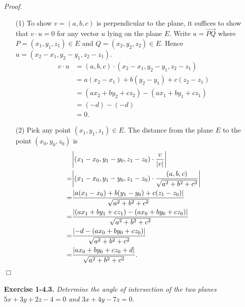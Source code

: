 \documentclass{article}
\begin{document}
\emph{Proof.}
\begin{enumerate}
\item[(1)]
To show $v=(a,b,c)$ is perpendicular to the plane,
it suffices to show that $v \cdot u = 0$ for any vector $u$ lying on the plane $E$.
Write $u = \overrightarrow{PQ}$ where
$P = (x_1, y_1, z_1) \in E$ and $Q = (x_2, y_2, z_2) \in E$.
Hence $u = (x_2-x_1, y_2-y_1, z_2-z_1)$.
\begin{align*}
v \cdot u
&=
(a,b,c) \cdot (x_2-x_1, y_2-y_1, z_2-z_1) \\
&= a(x_2-x_1) + b(y_2-y_1) + c(z_2-z_1) \\
&= (ax_2 + by_2 + cz_2) - (ax_1 + by_1 + cz_1) \\
&= (-d) - (-d) \\
&= 0.
\end{align*}
\item[(2)]
Pick any point $(x_1,y_1,z_1) \in E$.
The distance from the plane $E$ to the point $(x_0, y_0, z_0)$ is
\begin{align*}
&\abs{(x_1-x_0,y_1-y_0,z_1-z_0) \cdot \frac{v}{|v|}} \\
=& \abs{(x_1-x_0,y_1-y_0,z_1-z_0) \cdot \frac{(a,b,c)}{\sqrt{a^2+b^2+c^2}}} \\
=& \frac{\abs{a(x_1-x_0)+b(y_1-y_0)+c(z_1-z_0)}}{\sqrt{a^2+b^2+c^2}} \\
=& \frac{\abs{(ax_1+by_1+cz_1) - (ax_0+by_0+cz_0)}}{\sqrt{a^2+b^2+c^2}} \\
=& \frac{\abs{-d - (ax_0+by_0+cz_0)}}{\sqrt{a^2+b^2+c^2}} \\
=& \frac{\abs{ax_0+by_0+cz_0+d}}{\sqrt{a^2+b^2+c^2}}.
\end{align*}
\end{enumerate}
$\Box$ \\\\






\textbf{Exercise 1-4.3.}
\emph{Determine the angle of intersection of the two planes
$5x+3y+2z-4=0$ and $3x+4y-7z=0$.} \\
\end{document}
